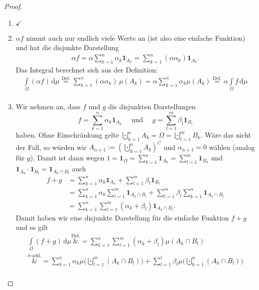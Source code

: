 \begin{proof}\abs
	\begin{enumerate}[label=(\roman*)]
		\item $\checkmark$
		\item $\alpha f$ nimmt auch nur endlich viele Werte an (ist also eine einfache Funktion) und hat die disjunkte Darstellung
		\begin{align*}
			\alpha f = \alpha \sum\limits_{k = 1}^{n} \alpha_k \mathbf{1}_{A_k} = \sum\limits_{k = 1}^{n} (\alpha \alpha_k) \mathbf{1}_{A_k}.
		\end{align*}	
		Das Integral berechnet sich aus der Definition:
		\begin{align*}
			 \int\limits_{\Omega} (\alpha f) \, \mathrm{d}\mu \overset{\text{Def.}}{=} \sum\limits_{k = 1}^{n} (\alpha \alpha_k)\, \mu(A_k) = \alpha \sum\limits_{k = 1}^{n} \alpha_k \mu(A_k)  \overset{\text{Def.}}{=}  \alpha \int\limits_{\Omega} f\, \mathrm{d}\mu\\
		\end{align*}
		\item Wir nehmen an, dass $f$ und $g$ die disjunkten Darstellungen \[ f = \sum\limits_{k = 1}^{n} \alpha_k \mathbf{1}_{A_k}\quad \text{ und } \quad g = \sum\limits_{l = 1}^{m} \beta_l \mathbf{1}_{B_l} \] haben. Ohne Einschr\"ankung gelte $\bigcupdot\limits_{k = 1}^{n} A_k = \Omega = \bigcupdot\limits_{l = 1}^{m} B_k.$
		W\"are das nicht der Fall, so w\"urden wir $A_{n+1}:=(\bigcupdot_{k=1}^n A_k)^C$ und $\alpha_{n+1}=0$ w\"ahlen (analog f\"ur $g$). Damit ist dann wegen $1=\mathbf{1}_\Omega= \sum_{k=1}^n \mathbf{1}_{A_k}=\sum_{l=1}^m \mathbf{1}_{B_k}$ und
		$\mathbf{1}_{A_k} \cdot \mathbf 1_{B_l}=\mathbf 1_{A_k\cap B_l}$ auch
		\begin{align*}
			f + g&= \sum\limits_{k = 1}^{n} \alpha_k \mathbf{1}_{A_k} + \sum\limits_{l = 1}^{m} \beta_l \mathbf{1}_{B_l}\\ 
			&= \sum\limits_{k = 1}^{n} \alpha_k \sum\limits_{l = 1}^{m} \mathbf{1}_{A_k \cap B_l} + \sum\limits_{l = 1}^{m} \beta_l \sum\limits_{k = 1}^{n} \mathbf{1}_{A_k \cap B_l} \\
			&= \sum\limits_{k = 1}^{n} \sum\limits_{l = 1}^{m} (\alpha_k + \beta_l) \mathbf{1}_{A_k \cap B_l}.
		\end{align*}
		Damit haben wir eine disjunkte Darstellung f\"ur die einfache Funktion $f+g$ und es gilt
		\begin{align*}
			\int\limits_{\Omega} (f + g)\, \mathrm{d}\mu \overset{\text{Def.}}&{=} \sum\limits_{k = 1}^{n} \sum\limits_{l = 1}^{m} (\alpha_k + \beta_l) \mu(A_k \cap B_l)\\ \overset{\sigma\text{-add.}}&{=}	\sum\limits_{k = 1}^{n} \alpha_k \mu\Big(\bigcupdot\limits_{l=1}^{m} (A_k \cap B_l) \Big) + \sum\limits_{l = 1}^{l} \beta_l \mu\Big(\bigcupdot\limits_{k=1}^{n} (A_k \cap B_l) \Big)\\

\end{align*}
\end{enumerate}
\end{proof}
